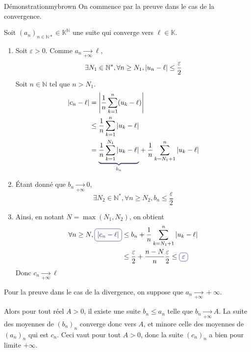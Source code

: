     \begin{demo}{Démonstration}{mybrown}
        On commence par la preuve dans le cas de la convergence.

        Soit $(a_n)_{n \in \mathbb{N*}} \in \mathbb{K}^{\mathbb{N}}$ une suite qui converge vers $\ell \in \mathbb{K}$.
    \begin{enumerate}
    \item Soit $\varepsilon > 0$. \newline
    Comme $a_n \underset{+\infty}{\longrightarrow} \ell$,
    \[ \exists N_1 \in \mathbb{N}^*, \forall n \geq N_1, \left\lvert u_n - \ell\right\rvert \leq \frac{\varepsilon}{2} \] 
    Soit $n \in \mathbb{N}$ tel que $n > N_1$. 
    \begin{align*}
        \abs{c_n - \ell} &= \abs{\frac{1}{n} \sum\limits_{k=1}^n (u_k-\ell)} \\
        &\leq \frac{1}{n} \sum\limits_{k=1}^n \abs{u_k-\ell} \\
        &= {\color{mypurple}\underbrace{{\color{black}\frac{1}{n} \sum\limits_{k=1}^{N_1} \abs{u_k-\ell}}}_{b_n}} + \frac{1}{n} \sum\limits_{k=N_1+1}^{n} \abs{u_k-\ell}
    \end{align*}
    \item Étant donné que $b_n \underset{+\infty}{\longrightarrow} 0$, 
    \[ \exists N_2 \in \mathbb{N}^*, \forall n \geq N_2, b_n \leq \frac{\varepsilon}{2} \] 
    \item Ainsi, en notant $N = \max(N_1,N_2)$, on obtient 
    \begin{align*}
        \forall n \geq N, \lilbox{mypurple}{$\abs{c_n - \ell}$} &\leq b_n + \frac{1}{n} \sum\limits_{k=N_1+1}^{n} \abs{u_k-\ell} \\
        &\leq \frac{\varepsilon}{2} + \frac{n-N}{n} \frac{\varepsilon}{2} \leq \lilbox{mypurple}{$\varepsilon$}
    \end{align*}
    Donc $c_n \underset{+\infty}{\longrightarrow} \ell$
    \end{enumerate}

    Pour la preuve dans le cas de la divergence, on suppose que $a_n \underset{+\infty}{\longrightarrow} + \infty$. 
    
    Alors pour tout réel $A > 0$, il existe une suite $b_n \leq a_n$ telle que $b_n \underset{+\infty}{\longrightarrow} A$. La suite des moyennes de $(b_n)_n$ converge donc vers $A$, et minore celle des moyennes de $(a_n)_n$ qui est $c_n$. Ceci vaut pour tout $A > 0$, donc la suite $(c_n)_n$ a bien pour limite $+ \infty$.
    \end{demo}